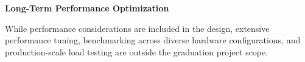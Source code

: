 \textbf{Long-Term Performance Optimization}

While performance considerations are included in the design, extensive performance tuning, benchmarking across diverse hardware configurations, and production-scale load testing are outside the graduation project scope.







